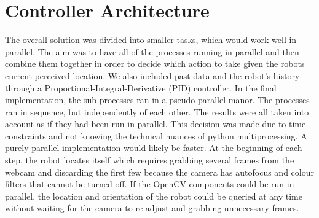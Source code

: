 \section{Controller Architecture}
\label{section::controller}

The overall solution was divided into smaller tasks, which would work well in parallel. The aim was to have all of the processes running in parallel and then combine them together in order to decide which action to take given the robots current perceived location\cite{prbts}. We also included past data and the robot’s history through a Proportional-Integral-Derivative (PID) controller. In the final implementation, the sub processes ran in a pseudo parallel manor. The processes ran in sequence, but independently of each other.  The results were all taken into account as if they had been run in parallel. This decision was made due to time constraints and not knowing the technical nuances of python multiprocessing. A purely parallel implementation would likely be faster\cite{i2amr}. At the beginning of each step, the robot locates itself which requires grabbing several frames from the webcam and discarding the first few because the camera has autofocus and colour filters that cannot be turned off. If the OpenCV components could be run in parallel, the location and orientation of the robot could be queried at any time without waiting for the camera to re adjust and grabbing unnecessary frames.
